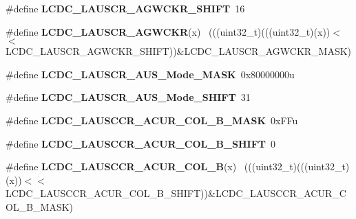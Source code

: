 \begin{DoxyCompactItemize}
\item 
\hypertarget{group___l_c_d_c___register___masks_gab1542381552966b04b81553edb8418fd}{}\#define {\bfseries L\+C\+D\+C\+\_\+\+L\+A\+U\+S\+C\+R\+\_\+\+A\+G\+W\+C\+K\+R\+\_\+\+S\+H\+I\+F\+T}~16\label{group___l_c_d_c___register___masks_gab1542381552966b04b81553edb8418fd}

\item 
\hypertarget{group___l_c_d_c___register___masks_ga9d13196e908df04daa8b0116951ec108}{}\#define {\bfseries L\+C\+D\+C\+\_\+\+L\+A\+U\+S\+C\+R\+\_\+\+A\+G\+W\+C\+K\+R}(x)                                    ~(((uint32\+\_\+t)(((uint32\+\_\+t)(x))$<$$<$L\+C\+D\+C\+\_\+\+L\+A\+U\+S\+C\+R\+\_\+\+A\+G\+W\+C\+K\+R\+\_\+\+S\+H\+I\+F\+T))\&L\+C\+D\+C\+\_\+\+L\+A\+U\+S\+C\+R\+\_\+\+A\+G\+W\+C\+K\+R\+\_\+\+M\+A\+S\+K)\label{group___l_c_d_c___register___masks_ga9d13196e908df04daa8b0116951ec108}

\item 
\hypertarget{group___l_c_d_c___register___masks_ga9e98509b2c8f4bf9e162d649de981ecb}{}\#define {\bfseries L\+C\+D\+C\+\_\+\+L\+A\+U\+S\+C\+R\+\_\+\+A\+U\+S\+\_\+\+Mode\+\_\+\+M\+A\+S\+K}~0x80000000u\label{group___l_c_d_c___register___masks_ga9e98509b2c8f4bf9e162d649de981ecb}

\item 
\hypertarget{group___l_c_d_c___register___masks_gac3549415c436fe32be9842827006ec07}{}\#define {\bfseries L\+C\+D\+C\+\_\+\+L\+A\+U\+S\+C\+R\+\_\+\+A\+U\+S\+\_\+\+Mode\+\_\+\+S\+H\+I\+F\+T}~31\label{group___l_c_d_c___register___masks_gac3549415c436fe32be9842827006ec07}

\item 
\hypertarget{group___l_c_d_c___register___masks_gaaba77a7d5f35559fcd918c8869ea22f4}{}\#define {\bfseries L\+C\+D\+C\+\_\+\+L\+A\+U\+S\+C\+C\+R\+\_\+\+A\+C\+U\+R\+\_\+\+C\+O\+L\+\_\+\+B\+\_\+\+M\+A\+S\+K}~0x\+F\+Fu\label{group___l_c_d_c___register___masks_gaaba77a7d5f35559fcd918c8869ea22f4}

\item 
\hypertarget{group___l_c_d_c___register___masks_ga2f417c68228e74c680b7758b039450cb}{}\#define {\bfseries L\+C\+D\+C\+\_\+\+L\+A\+U\+S\+C\+C\+R\+\_\+\+A\+C\+U\+R\+\_\+\+C\+O\+L\+\_\+\+B\+\_\+\+S\+H\+I\+F\+T}~0\label{group___l_c_d_c___register___masks_ga2f417c68228e74c680b7758b039450cb}

\item 
\hypertarget{group___l_c_d_c___register___masks_ga7c3319dc9823fd06d1e98e502f73669a}{}\#define {\bfseries L\+C\+D\+C\+\_\+\+L\+A\+U\+S\+C\+C\+R\+\_\+\+A\+C\+U\+R\+\_\+\+C\+O\+L\+\_\+\+B}(x)                          ~(((uint32\+\_\+t)(((uint32\+\_\+t)(x))$<$$<$L\+C\+D\+C\+\_\+\+L\+A\+U\+S\+C\+C\+R\+\_\+\+A\+C\+U\+R\+\_\+\+C\+O\+L\+\_\+\+B\+\_\+\+S\+H\+I\+F\+T))\&L\+C\+D\+C\+\_\+\+L\+A\+U\+S\+C\+C\+R\+\_\+\+A\+C\+U\+R\+\_\+\+C\+O\+L\+\_\+\+B\+\_\+\+M\+A\+S\+K)\label{group___l_c_d_c___register___masks_ga7c3319dc9823fd06d1e98e502f73669a}


\end{DoxyCompactItemize}

